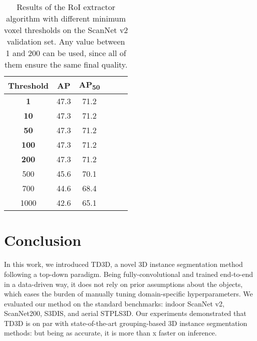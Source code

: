 \documentclass[10pt,twocolumn,letterpaper]{article}
\begin{document}
\begin{table}[!h]
    \centering
\begin{tabular}{cccccc}
    \toprule
    Threshold & AP & AP\textsubscript{50} \\
    \midrule
    \textbf{1}    & 47.3 & 71.2 \\
    \textbf{10}   & 47.3 & 71.2 \\
    \textbf{50}   & 47.3 & 71.2 \\
    \textbf{100}  & 47.3 & 71.2 \\
    \textbf{200}  & 47.3 & 71.2 \\
    500  & 45.6 & 70.1  \\
    700  & 44.6 & 68.4  \\
    1000 & 42.6 & 65.1  \\
    \bottomrule
    \end{tabular}
    \caption{Results of the RoI extractor algorithm with different minimum voxel thresholds on the ScanNet v2 validation set. Any value between 1 and 200 can be used, since all of them ensure the same final quality.}
    \label{tab:roi-extractor}
\end{table}

\section{Conclusion}

In this work, we introduced TD3D, a novel 3D instance segmentation method following a top-down paradigm. Being fully-convolutional and trained end-to-end in a data-driven way, it does not rely on prior assumptions about the objects, which eases the burden of manually tuning domain-specific hyperparameters. We evaluated our method on the standard benchmarks: indoor ScanNet v2, ScanNet200, S3DIS, and aerial STPLS3D. Our experiments demonstrated that TD3D is on par with state-of-the-art grouping-based 3D instance segmentation methods: but being as accurate, it is more than x faster on inference.


{\small


}
\end{document}
